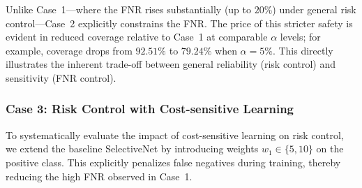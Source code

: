 \documentclass[sigconf,review,anonymous]{acmart}
\theoremstyle{remark}
\begin{document}
Unlike Case~1—where the FNR rises substantially (up to $20\%$) under general risk control—Case~2 explicitly constrains the FNR. The price of this stricter safety is evident in reduced coverage relative to Case~1 at comparable $\alpha$ levels; for example, coverage drops from $92.51\%$ to $79.24\%$ when $\alpha=5\%$. This directly illustrates the inherent trade-off between general reliability (risk control) and sensitivity (FNR control).

\subsubsection{\textbf{Case 3: Risk Control with Cost-sensitive Learning}}
\label{sec:case3_results}

To systematically evaluate the impact of cost-sensitive learning on risk control, we extend the baseline SelectiveNet by introducing weights $w_1 \in \{5, 10\}$ on the positive class. This explicitly penalizes false negatives during training, thereby reducing the high FNR observed in Case~1.

\begin{table}[htbp]
    \centering
    \caption{The selective classification performance of Case 3 ($w_{1}=5$ and $w_{1}=10$).}
    \label{tab:case3_results}
    \vskip -0.1in
    \vskip -0.1in
\end{table}
\end{document}
